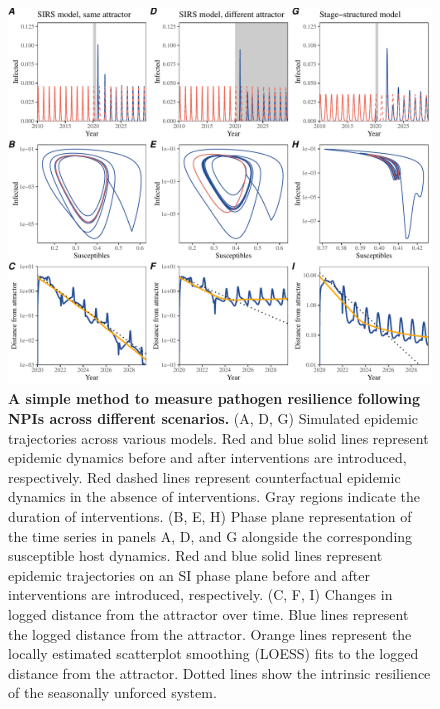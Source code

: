 \documentclass[12pt]{article}
\begin{document}
\begin{figure}[!th]
\includegraphics[width=\textwidth]{../figure2/figure2_simple.pdf}
\caption{
\textbf{A simple method to measure pathogen resilience following NPIs across different scenarios.}
(A, D, G) Simulated epidemic trajectories across various models. 
Red and blue solid lines represent epidemic dynamics before and after interventions are introduced, respectively.
Red dashed lines represent counterfactual epidemic dynamics in the absence of interventions.
Gray regions indicate the duration of interventions.
(B, E, H) Phase plane representation of the time series in panels A, D, and G alongside the corresponding susceptible host dynamics.
Red and blue solid lines represent epidemic trajectories on an SI phase plane before and after interventions are introduced, respectively.
(C, F, I) Changes in logged distance from the attractor over time.
Blue lines represent the logged distance from the attractor.
Orange lines represent the locally estimated scatterplot smoothing (LOESS) fits to the logged distance from the attractor.
Dotted lines show the intrinsic resilience of the seasonally unforced system.
}
\end{figure}
\end{document}
